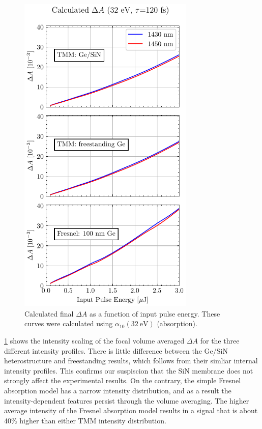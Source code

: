 \begin{figure}
	\centering
	\includegraphics[width=0.75\textwidth]{figures/chap4/FVA_XUV_signal.pdf}
	\caption{Calculated final $\Delta A$ as a function of input pulse energy. These curves were calculated using $\alpha_{10}(32 \ \textrm{eV})$ (absorption).}
	\label{fig:FVA_XUV_signal}
\end{figure}

\cref{fig:FVA_XUV_signal} shows the intensity scaling of the focal volume averaged $\Delta A$ for the three different intensity profiles. There is little difference between the Ge/SiN heterostructure and freestanding results, which follows from their simliar internal intensity profiles. This confirms our suspiscion that the SiN membrane does not strongly affect the experimental results. On the contrary, the simple Fresnel absorption model has a narrow intensity distribution, and as a result the intensity-dependent features persist through the volume averaging. The higher average intensity of the Fresnel absorption model results in a signal that is about 40\% higher than either TMM intensity distribution.

